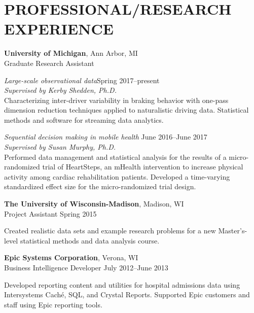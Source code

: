 \documentclass[letterpaper, 11pt]{article}
\begin{document}
\section{PROFESSIONAL/RESEARCH EXPERIENCE}

{\bf University of Michigan}, Ann Arbor, MI\\
Graduate Research Assistant

{\addtolength{\leftskip}{15pt}\textit{Large-scale observational data}\hfill Spring 2017--present\\
\textit{Supervised by Kerby Shedden, Ph.D.}\\
Characterizing inter-driver variability in braking behavior with one-pass dimension reduction techniques applied to naturalistic driving data. Statistical methods and software for streaming data analytics.

}

{\addtolength{\leftskip}{15pt} \textit{Sequential decision making in mobile health} \hfill June 2016--June 2017\\
\textit{Supervised by Susan Murphy, Ph.D.}\\
Performed data management and statistical analysis for the results of a micro-randomized trial of HeartSteps, an mHealth intervention to increase  physical activity among cardiac rehabilitation patients. Developed a time-varying standardized effect size for the micro-randomized trial design. 

}

{\bf The University of Wisconsin-Madison}, Madison, WI\\
Project Assistant \hfill Spring 2015

{\addtolength{\leftskip}{15pt}
 Created realistic data sets and example research problems for a new Master's-level
  statistical methods and data analysis course.

}

{\bf Epic Systems Corporation}, Verona, WI\\
Business Intelligence Developer \hfill July 2012--June 2013

{\addtolength{\leftskip}{15pt}
 Developed reporting content and utilities for hospital
  admissions data using Intersystems
  Cach\'{e}, SQL, and Crystal Reports.
 Supported Epic customers and
  staff using Epic reporting tools.

}
\end{document}
